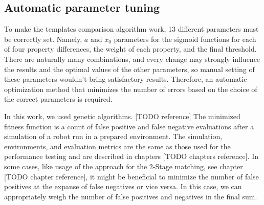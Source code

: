 \subsection{Automatic parameter tuning}\label{section:parameterTuning}

To make the templates comparison algorithm work, 13 different parameters must be correctly set. Namely, $a$ and $x_0$ parameters for the sigmoid functions for each of four property differences, the weight of each property, and the final threshold. There are naturally many combinations, and every change may strongly influence the results and the optimal values of the other parameters, so manual setting of these parameters wouldn't bring satisfactory results. Therefore, an automatic optimization method that minimizes the number of errors based on the choice of the correct parameters is required.\par
In this work, we used genetic algorithms. [TODO reference] The minimized fitness function is a count of false positive and false negative evaluations after a simulation of a robot run in a prepared environment. The simulation, environments, and evaluation metrics are the same as those used for the performance testing and are described in chapters [TODO chapters reference]. In some cases, like usage of the approach for the 2-Stage matching, see chapter [TODO chapter reference], it might be beneficial to minimize the number of false positives at the expanse of false negatives or vice versa. In this case, we can appropriately weigh the number of false positives and negatives in the final sum.